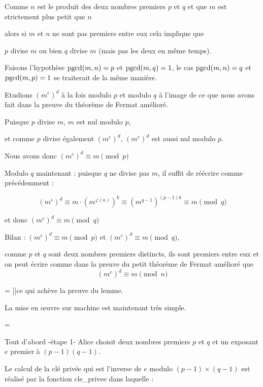 Comme $n$ est le produit des deux nombres premiers $p$ et $q$ et que $m$ 
est strictement plus petit que $n$

alors si $m$ et $n$ ne sont pas premiers entre eux cela implique que 

$p$ divise $m$ ou bien $q$ divise $m$ (mais pas les deux en même temps).


Faisons l'hypothèse $\mathop{\mathrm{pgcd}}\nolimits(m,n)=p$ et  $\mathop{\mathrm{pgcd}}\nolimits(m,q)=1$, le cas  $\mathop{\mathrm{pgcd}}\nolimits(m,n)=q$  et $\mathop{\mathrm{pgcd}}\nolimits(m,p)=1$ se traiterait de la même manière.

\change

Etudions $(m^e)^d$ à la fois modulo $p$ et modulo $q$ 
à l'image de ce que nous avons fait dans la preuve du théorème de Fermat amélioré.

Puisque $p$ divise $m$, $m$ est nul modulo $p$,

\change 

et comme $p$ divise également $(m^e)^d$, 
$(m^e)^d$ est aussi nul modulo $p$.

\change 

Nous avons donc $(m^e)^d \equiv  m \pmod{p}$

\change 

Modulo $q$ maintenant : puisque $q$ ne divise pas $m$, 
il suffit de réécrire comme précédemment :
 
$$(m^e)^d \equiv m \cdot (m^{\varphi(n)})^k \equiv (m^{q-1})^{(p-1)k} \equiv m \pmod {q}$$
      
et donc $(m^e)^d \equiv  m \pmod{q}$

\change

Bilan : $(m^e)^d \equiv  m \pmod{p}$ et $(m^e)^d \equiv  m \pmod{q}$,

comme $p$ et $q$ sont deux nombres premiers distincts, ils sont premiers entre eux 
et on peut écrire comme dans la preuve du petit théorème de Fermat amélioré que  
$$(m^e)^d  \equiv  m \pmod{n}$$

=
||ce qui achève la preuve du lemme.


\diapo

La mise en \oe uvre sur machine est maintenant très simple. 

=

Tout d'abord -étape 1- Alice choisit 
deux nombres premiers $p$ et $q$ et un exposant $e$ premier à $(p-1)(q-1)$.

Le calcul de la clé privée qui est l'inverse de $e$ modulo $(p-1)\times (q-1)$ est réalisé par la fonction cle\_privee dans laquelle : 

